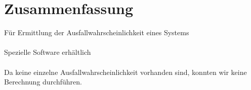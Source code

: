 \documentclass{beamer}
\begin{document}
\section{Zusammenfassung}
\frame{\tableofcontents[currentsection]}
\begin{frame}
	Für Ermittlung der Ausfallwahrscheinlichkeit eines Systems\\~\\
	Spezielle Software erhältlich\\~\\
	Da keine einzelne Ausfallwahrscheinlichkeit vorhanden sind, konnten wir keine Berechnung durchführen.
	
	
	
	
\end{frame}
\end{document}
